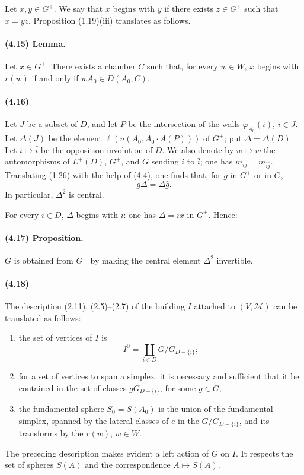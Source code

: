 \documentclass[10pt]{article}
\begin{document}
Let \(x,y\in G^+\). We say that \(x\) begins with \(y\) if there exists \(z\in G^+\) such that \(x=yz\). Proposition (1.19)(iii) translates as follows.

\paragraph{(4.15) Lemma.} Let \(x\in G^+\). There exists a chamber \(C\) such that, for every \(w\in W\), \(x\) begins with \(r(w)\) if and only if \(wA_0\in D(A_0,C)\).

\paragraph{(4.16)} Let \(J\) be a subset of \(D\), and let \(P\) be the intersection of the walls \(\varphi_{A_0}(i)\), \(i\in J\). Let \(\Delta(J)\) be the element \(\ell(u(A_0,A_0\cdot A(P)))\) of \(G^+\); put \(\Delta=\Delta(D)\). Let \(i\mapsto\bar i\) be the opposition involution of \(D\). We also denote by \(w\mapsto\bar w\) the automorphisms of \(L^+(D)\), \(G^+\), and \(G\) sending \(i\) to \(\bar i\); one has \(m_{ij}=m_{\bar i\bar j}\). Translating (1.26) with the help of (4.4), one finds that, for \(g\) in \(G^+\) or in \(G\),
\[
\tag{4.16.1}
g\Delta=\Delta\bar g.
\]
In particular, \(\Delta^2\) is central.

For every \(i\in D\), \(\Delta\) begins with \(i\): one has \(\Delta=ix\) in \(G^+\). Hence:

\paragraph{(4.17) Proposition.} \(G\) is obtained from \(G^+\) by making the central element \(\Delta^2\) invertible.

\paragraph{(4.18)} The description (2.11), (2.5)--(2.7) of the building \(I\) attached to \((V,\mathcal M)\) can be translated as follows:
\begin{enumerate}[label=\alph*)]
\item the set of vertices of \(I\) is
\[
I^0=\coprod_{i\in D}G/G_{D-\{i\}};
\]
\item for a set of vertices to span a simplex, it is necessary and sufficient that it be contained in the set of classes \(gG_{D-\{i\}}\), for some \(g\in G\);
\item the fundamental sphere \(S_0=S(A_0)\) is the union of the fundamental simplex, spanned by the lateral classes of \(e\) in the \(G/G_{D-\{i\}}\), and its transforms by the \(r(w)\), \(w\in W\).
\end{enumerate}
The preceding description makes evident a left action of \(G\) on \(I\). It respects the set of spheres \(S(A)\) and the correspondence \(A\mapsto S(A)\).
\end{document}

